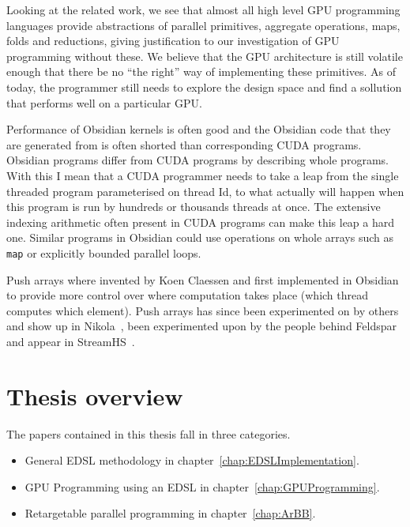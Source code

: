 \documentclass[a4paper]{book}
\begin{document}
Looking at the related work, we see that almost all high level GPU programming 
languages provide abstractions of parallel primitives, aggregate operations, 
maps, folds and reductions, giving justification to our investigation of GPU 
programming without these. We believe that the GPU architecture is still volatile 
enough that there be no ``the right'' way of implementing these primitives. As of 
today, the programmer still needs to explore the design space and find a sollution 
that performs well on a particular GPU. 

Performance of Obsidian kernels is often good and the Obsidian code that they 
are generated from is often shorted than corresponding CUDA programs. Obsidian 
programs differ from CUDA programs by describing whole programs. With this I mean 
that a CUDA programmer needs to take a leap from the single threaded program 
parameterised on thread Id, to what actually will happen when this program is 
run by hundreds or thousands threads at once. The extensive indexing arithmetic 
often present in CUDA programs can make this leap a hard one. Similar programs 
in Obsidian could use operations on whole arrays such as {\tt map} or explicitly 
bounded parallel loops. 

Push arrays where invented by Koen Claessen and first implemented in Obsidian 
to provide more control over where computation takes place (which thread computes 
which element). Push arrays has since been experimented on by others and show up 
in Nikola~\citet{NIKOLAPUSH}, been experimented upon by the people behind Feldspar 
and appear in StreamHS~\citet{FPCDSL}. 


%
%
\section{Thesis overview} 


The papers contained in this thesis fall in three categories. 
\begin{itemize} 
\item General EDSL methodology in chapter~\ref{chap:EDSLImplementation}. 
\item GPU Programming using an EDSL in chapter~\ref{chap:GPUProgramming}. 
\item Retargetable parallel programming in chapter~\ref{chap:ArBB}. 
\end{itemize} 
\end{document}

